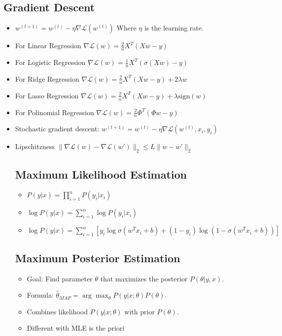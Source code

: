 \documentclass[a4paper,7pt]{extarticle}
\theoremstyle{definition}
\begin{document}
\begin{multicols*}{2}
\subsection{Gradient Descent}

\begin{itemize}
\item $w^{(t+1)} = w^{(t)} - \eta \nabla \mathcal{L}(w^{(t)})$ Where $\eta$ is the learning rate.
\item For Linear Regression   $\nabla \mathcal{L}(w) = \frac{2}{n} X^T (X w - y)$
\item For Logistic Regression $\nabla \mathcal{L}(w) = \frac{1}{n} X^T (\sigma(X w) - y)$
\item For Ridge Regression    $\nabla \mathcal{L}(w) = \frac{2}{n} X^T (X w - y) + 2 \lambda w$
\item For Lasso Regression    $\nabla \mathcal{L}(w) = \frac{2}{n} X^T (X w - y) + \lambda \text{sign}(w)$
\item For Polinomial Regression $\nabla \mathcal{L}(w) = \frac{2}{n} \Phi^T (\Phi w - y)$
\item Stochastic gradient descent: $w^{(t+1)} = w^{(t)} - \eta \nabla \mathcal{L}(w^{(t)}, x_i, y_i)$
\item Lipschitzness     $\|\nabla \mathcal{L}(w) - \nabla \mathcal{L}(w')\|_2 \leq L \|w - w'\|_2$ 

\subsection{Maximum Likelihood Estimation}

\begin{itemize}
\item \( P(y|x) = \prod_{i=1}^n P(y_i|x_i) \)
\item \( \log P(y|x) = \sum_{i=1}^n \log P(y_i|x_i) \)
\item \( \log P(y|x) = \sum_{i=1}^n [ y_i \log \sigma(w^T x_i + b) + (1 - y_i) \log(1 - \sigma(w^T x_i + b)) ] \)
\end{itemize}

\subsection{Maximum Posterior Estimation}

\begin{itemize}
\item Goal: Find parameter \( \theta \) that maximizes the posterior \( P(\theta|y,x) \).
\item Formula: \( \hat{\theta}_{MAP} = \arg\max_{\theta} P(y|x; \theta) P(\theta) \).
\item Combines likelihood \( P(y|x; \theta) \) with prior \( P(\theta) \).
\item Different with MLE is the priori
\end{itemize}


\end{itemize}
\end{multicols*}
\end{document}
